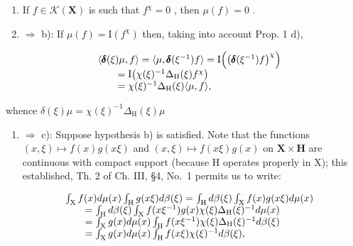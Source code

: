 \begin{enumerate}
\def\labelenumi{\alph{enumi})}
\setcounter{enumi}{3}
\item
  If \(f \in \mathcal{K}(\mathbf{X})\) is such that \(f^{\chi} = 0\) , then \(\mu(f) = 0\) .
\item
  \(\Rightarrow\) b): If \(\mu(f)=\mathrm{I}(f^{\chi})\) then, taking into account Prop. 1 d),
\end{enumerate}

\[
\begin{array}{r l} & {\langle \pmb {\delta} (\xi) \mu , f \rangle = \langle \mu , \pmb {\delta} (\xi^ {- 1}) f \rangle = \mathrm{I} \Big (\big (\pmb {\delta} (\xi^ {- 1}) f \big) ^ {\chi} \Big)} \\ & {\qquad = \mathrm{I} \big (\chi (\xi) ^ {- 1} \Delta_ {\mathrm{H}} (\xi) f ^ {\chi} \big)} \\ & {\qquad = \chi (\xi) ^ {- 1} \Delta_ {\mathrm{H}} (\xi) \langle \mu , f \rangle ,} \end{array}
\]

whence \(\delta (\xi)\mu = \chi (\xi)^{-1}\Delta_{\mathrm{H}}(\xi)\mu\)

\begin{enumerate}
\def\labelenumi{\alph{enumi})}
\setcounter{enumi}{1}
\tightlist
\item
  \(\Rightarrow\) c): Suppose hypothesis b) is satisfied. Note that the functions \((x,\xi)\mapsto f(x)g(x\xi)\) and \((x,\xi)\mapsto f(x\xi)g(x)\) on \(\mathbf{X}\times\mathbf{H}\) are continuous with compact support (because H operates properly in X); this established, Th. 2 of Ch. III, §4, No.~1 permits us to write:
\end{enumerate}

\[
\begin{array}{r l} & {\int_ {\mathrm{X}} f (x) d \mu (x) \int_ {\mathrm{H}} g (x \xi) d \beta (\xi) = \int_ {\mathrm{H}} d \beta (\xi) \int_ {\mathrm{X}} f (x) g (x \xi) d \mu (x)} \\ & {\qquad = \int_ {\mathrm{H}} d \beta (\xi) \int_ {\mathrm{X}} f (x \xi^ {- 1}) g (x) \chi (\xi) \Delta_ {\mathrm{H}} (\xi) ^ {- 1} d \mu (x)} \\ & {\qquad = \int_ {\mathrm{X}} g (x) d \mu (x) \int_ {\mathrm{H}} f (x \xi^ {- 1}) \chi (\xi) \Delta_ {\mathrm{H}} (\xi) ^ {- 1} d \beta (\xi)} \\ & {\qquad = \int_ {\mathrm{X}} g (x) d \mu (x) \int_ {\mathrm{H}} f (x \xi) \chi (\xi) ^ {- 1} d \beta (\xi),} \end{array}
\]

